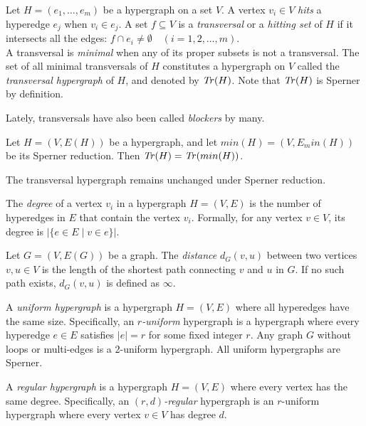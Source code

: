 \begin{definition}
Let $H=(e_1,\dots,e_m)$ be a hypergraph on a set $V$. A vertex $v_i\in V$ \emph{hits} a hyperedge $e_j$ when $v_i\in e_j$. A set $f\subseteq V$ is a \emph{transversal} or a \emph{hitting set} of $H$ if it intersects all the edges: $f\cap e_i\neq\emptyset\quad(i=1,2,\dots,m)$.\\
A transversal is \emph{minimal} when any of its proper subsets is not a transversal. The set of all minimal transversals of $H$ constitutes a hypergraph on $V$ called the \emph{transversal hypergraph} of $H$, and denoted by $\mathit{Tr}(H)$. Note that $\mathit{Tr}(H)$ is Sperner by definition.
\end{definition}

Lately, transversals have also been called \emph{blockers} by many.

\begin{proposition}
Let $H=(V,E(H))$ be a hypergraph, and let $min(H)=(V,E_min(H))$ be its Sperner reduction. Then $\mathit{Tr}(H)=\mathit{Tr}(min(H))$.
\end{proposition}

\cite{Ber87} The transversal hypergraph remains unchanged under Sperner reduction.

\begin{definition}
The \emph{degree} of a vertex $v_i$ in a hypergraph $H=(V,E)$ is the number of hyperedges in $E$ that contain the vertex $v_i$. Formally, for any vertex $v\in V$, its degree is $|\{e\in E\mid v\in e\}|$.
\end{definition}

\begin{definition}\label{def:distance}
Let $G=(V,E(G))$ be a graph. The \emph{distance} $d_G(v,u)$ between two vertices $v,u\in V$ is the length of the shortest path connecting $v$ and $u$ in $G$. If no such path exists, $d_G(v,u)$ is defined as $\infty$.
\end{definition}

\begin{definition}
A \emph{uniform hypergraph} is a hypergraph $H=(V,E)$ where all hyperedges have the same size. Specifically, an \emph{$r$-uniform} hypergraph is a hypergraph where every hyperedge $e\in E$ satisfies $|e|=r$ for some fixed integer $r$. Any graph $G$ without loops or multi-edges is a 2-uniform hypergraph. All uniform hypergraphs are Sperner.
\end{definition}

\begin{definition}
A \emph{regular hypergraph} is a hypergraph $H=(V,E)$ where every vertex has the same degree. Specifically, an \emph{$(r,d)$-regular} hypergraph is an $r$-uniform hypergraph where every vertex $v\in V$ has degree $d$.
\end{definition}

